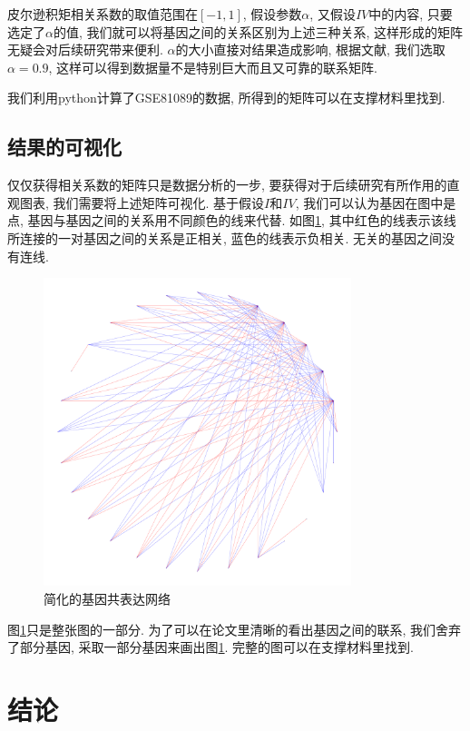 \documentclass[zihao=-4]{ctexart}
\begin{document}
皮尔逊积矩相关系数的取值范围在$[-1,1]$, 假设参数$\alpha$, 又假设$IV$中的内容, 只要选定了$\alpha$的值, 我们就可以将基因之间的关系区别为上述三种关系, 这样形成的矩阵无疑会对后续研究带来便利. $\alpha$的大小直接对结果造成影响, 根据文献\cite{wiki:pierxun}, 我们选取$\alpha=0.9$, 这样可以得到数据量不是特别巨大而且又可靠的联系矩阵.

我们利用python计算了GSE81089的数据, 所得到的矩阵可以在支撑材料里找到.

\subsection{结果的可视化}

仅仅获得相关系数的矩阵只是数据分析的一步, 要获得对于后续研究有所作用的直观图表, 我们需要将上述矩阵可视化. 基于假设$I$和$IV$, 我们可以认为基因在图中是点, 基因与基因之间的关系用不同颜色的线来代替. 如图\ref{1}, 其中红色的线表示该线所连接的一对基因之间的关系是正相关, 蓝色的线表示负相关. 无关的基因之间没有连线.
\begin{figure}[H]
    \centering
    \caption{简化的基因共表达网络}
    \label{1}
    \includegraphics[width=0.8\textwidth]{pic/plot100.png}
\end{figure}

图\ref{1}只是整张图的一部分. 为了可以在论文里清晰的看出基因之间的联系, 我们舍弃了部分基因, 采取一部分基因来画出图\ref{1}. 完整的图可以在支撑材料里找到.

\newpage
\section*{结论}
\end{document}
